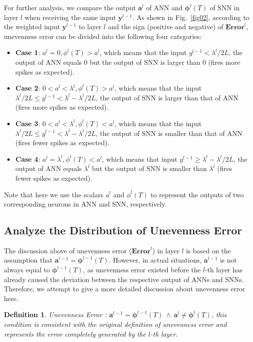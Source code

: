 \documentclass[letterpaper]{article} %
\newtheorem{definition}{Definition}
\begin{document}
For further analysis, we compare the output $\boldsymbol{a}^{l}$ of ANN and $\boldsymbol{\phi}^{l}(T)$ of SNN in layer $l$ when receiving the same input $\boldsymbol{y}^{l-1}$.
As shown in  Fig.~\ref{fig02}, 
according to the  weighted input $\boldsymbol{y}^{l-1}$ to layer $l$ and the sign (positive and negative) of $\textbf{Error}^l$, unevenness error can be divided into the following four categories:
\begin{itemize}
    \item[$\bullet$] \textbf{Case 1}: ${a}^l=0, \phi^l(T)>{a}^l$, which means that the input ${y}^{l-1}< \lambda^l/2L$, the output of ANN equals 0 but the output of SNN is larger than 0 (fires more spikes as expected).
     \item[$\bullet$] \textbf{Case 2}: $0<{a}^l<\lambda^l,\phi^l(T)>{a}^l$, which means that the input $\lambda^l/2L \leqslant {y}^{l-1}<\lambda^l-\lambda^l/2L$, the output of SNN is larger than that of ANN (fires more spikes as expected).
     \item[$\bullet$] \textbf{Case 3}: $0<{a}^l<\lambda^l,\phi^l(T)<{a}^l$, which means that the input $\lambda^l/2L \leqslant {y}^{l-1}<\lambda^l-\lambda^l/2L$, the output of SNN is smaller than that of ANN (fires fewer spikes as expected).    
        \item[$\bullet$] \textbf{Case 4}: ${a}^l=\lambda^l,\phi^l(T)<{a}^l$, which means that  input ${y}^{l-1}\geqslant \lambda^l-\lambda^l/2L$, the output of ANN equals $\lambda^l$ but the output of SNN is smaller than $\lambda^l$ (fires fewer spikes as expected).
\end{itemize}
Note that here we use the scalars $a^l$ and $\phi^l(T)$ to represent the outputs of two corresponding neurons in ANN and SNN, respectively.

\subsection{Analyze the Distribution of Unevenness Error}
The discussion above of unevenness error ($\textbf{Error}^l$) in layer $l$ is based on the assumption that $\boldsymbol{a}^{l-1}=\boldsymbol{\phi}^{l-1}(T)$. However, in actual situations, $\boldsymbol{a}^{l-1}$ is not always equal to $\boldsymbol{\phi}^{l-1}(T)$, as unevenness error existed before the $l$-th layer has already caused the deviation between the respective output of ANNs and SNNs. Therefore, we attempt to give a more detailed discussion about unevenness error here.

\begin{definition}
\rm{Unevenness Error \uppercase\expandafter{}}: $\boldsymbol{a}^{l-1}=\boldsymbol{\phi}^{l-1}(T)~\wedge~\boldsymbol{a}^{l} \neq \boldsymbol{\phi}^{l}(T)$, this condition is consistent with the original definition of unevenness error and represents the error completely generated by the $l$-th layer.
\end{definition}
\end{document}

